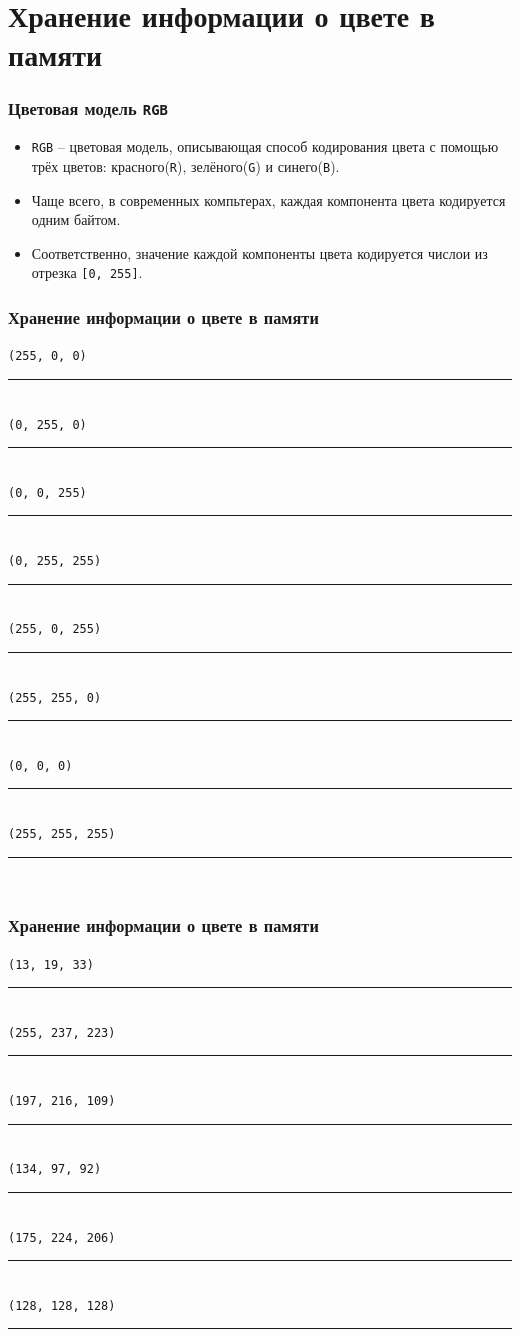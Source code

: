 \documentclass[10pt,pdf,hyperref={unicode}]{beamer}
\begin{document}
\section{Хранение информации о цвете в памяти}


\newcommand{\cbox}{\hspace{9mm}\rule[-1mm]{70mm}{5mm}}

\begin{frame}[fragile]
\frametitle{Цветовая модель \texttt{RGB}} 
\begin{itemize}
\item \texttt{RGB} -- цветовая модель, описывающая способ кодирования цвета с помощью трёх цветов: 
красного(\texttt{R}), зелёного(\texttt{G}) и  синего(\texttt{B}).\\
\item Чаще всего, в современных компьтерах, каждая компонента цвета кодируется одним байтом.
\item Соответственно, значение каждой компоненты цвета кодируется числои из отрезка \texttt{[0, 255]}.
\end{itemize}


\end{frame}

\begin{frame}[fragile]
\frametitle{Хранение информации о цвете в памяти} 
\raggedleft
\texttt{(255, 0, 0)}	\textcolor[RGB]{255, 0, 0}{\cbox}\\
\texttt{(0, 255, 0)} 	\textcolor[RGB]{0, 255, 0}{\cbox}\\
\texttt{(0, 0, 255)} 	\textcolor[RGB]{0, 0, 255}{\cbox}\\
\texttt{(0, 255, 255)} 	\textcolor[RGB]{0, 255, 255}{\cbox}\\
\texttt{(255, 0, 255)} 	\textcolor[RGB]{255, 0, 255}{\cbox}\\
\texttt{(255, 255, 0)} 	\textcolor[RGB]{255, 255, 0}{\cbox}\\
\texttt{(0, 0, 0)} 		\textcolor[RGB]{0, 0, 0}{\cbox}\\
\texttt{(255, 255, 255)}	\textcolor[RGB]{255, 255, 255}{  \cbox}\\
\end{frame}

\begin{frame}[fragile]
\frametitle{Хранение информации о цвете в памяти} 
\raggedleft
\texttt{(13, 19, 33)}		\textcolor[HTML]{0D1321}{\cbox}\\
\texttt{(255, 237, 223)}	\textcolor[HTML]{FFEDDF}{\cbox}\\
\texttt{(197, 216, 109)}	\textcolor[HTML]{C5D86D}{\cbox}\\
\texttt{(134, 97, 92)}		\textcolor[HTML]{86615C}{\cbox}\\
\texttt{(175, 224, 206)}	\textcolor[HTML]{AFE0CE}{\cbox}\\
\texttt{(128, 128, 128)}	\textcolor[HTML]{808080}{\cbox}\\
\end{frame}
\end{document}
